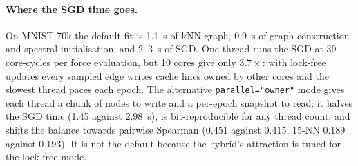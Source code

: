 \documentclass[11pt]{article}
\begin{document}
\paragraph{Where the SGD time goes.} On MNIST 70k the default fit is 1.1~s of kNN graph, 0.9~s of graph
construction and spectral initialisation, and 2--3~s of SGD. One thread runs the SGD at 39 core-cycles
per force evaluation, but 10 cores give only $3.7\times$: with lock-free updates every sampled edge
writes cache lines owned by other cores and the slowest thread paces each epoch. The alternative
\texttt{parallel="owner"} mode gives each thread a chunk of nodes to write and a per-epoch snapshot to
read: it halves the SGD time (1.45 against 2.98~s), is bit-reproducible for any thread count, and shifts
the balance towards pairwise Spearman (0.451 against 0.415, 15-NN 0.189 against 0.193). It is not the
default because the hybrid's attraction is tuned for the lock-free mode.
\end{document}
